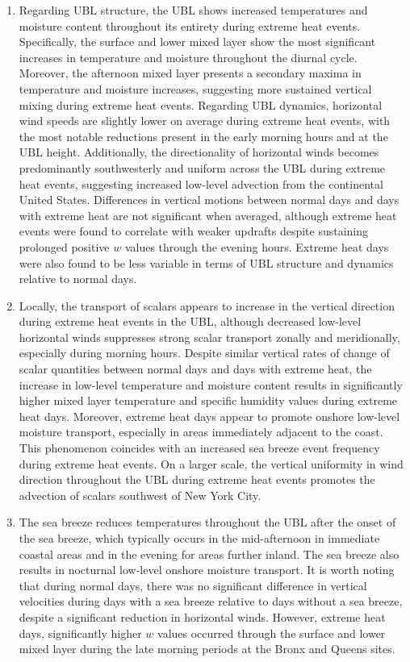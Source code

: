 \begin{enumerate}
	\item Regarding UBL structure, the UBL shows increased temperatures and moisture content throughout its entirety during extreme heat events. Specifically, the surface and lower mixed layer show the most significant increases in temperature and moisture throughout the diurnal cycle. Moreover, the afternoon mixed layer presents a secondary maxima in temperature and moisture increases, suggesting more sustained vertical mixing during extreme heat events. Regarding UBL dynamics, horizontal wind speeds are slightly lower on average during extreme heat events, with the most notable reductions present in the early morning hours and at the UBL height. Additionally, the directionality of horizontal winds becomes predominantly southwesterly and uniform across the UBL during extreme heat events, suggesting increased low-level advection from the continental United States. Differences in vertical motions between normal days and days with extreme heat are not significant when averaged, although extreme heat events were found to correlate with weaker updrafts despite sustaining prolonged positive $w$ values through the evening hours. Extreme heat days were also found to be less variable in terms of UBL structure and dynamics relative to normal days.
	\item Locally, the transport of scalars appears to increase in the vertical direction during extreme heat events in the UBL, although decreased low-level horizontal winds suppresses strong scalar transport zonally and meridionally, especially during morning hours. Despite similar vertical rates of change of scalar quantities between normal days and days with extreme heat, the increase in low-level temperature and moisture content results in significantly higher mixed layer temperature and specific humidity values during extreme heat days. Moreover, extreme heat days appear to promote onshore low-level moisture transport, especially in areas immediately adjacent to the coast. This phenomenon coincides with an increased sea breeze event frequency during extreme heat events. On a larger scale, the vertical uniformity in wind direction throughout the UBL during extreme heat events promotes the advection of scalars southwest of New York City. 
	\item The sea breeze reduces temperatures throughout the UBL after the onset of the sea breeze, which typically occurs in the mid-afternoon in immediate coastal areas and in the evening for areas further inland. The sea breeze also results in nocturnal low-level onshore moisture transport. It is worth noting that during normal days, there was no significant difference in vertical velocities during days with a sea breeze relative to days without a sea breeze, despite a significant reduction in horizontal winds. However, extreme heat days, significantly higher $w$ values occurred through the surface and lower mixed layer during the late morning periods at the Bronx and Queens sites.
	
\end{enumerate}

